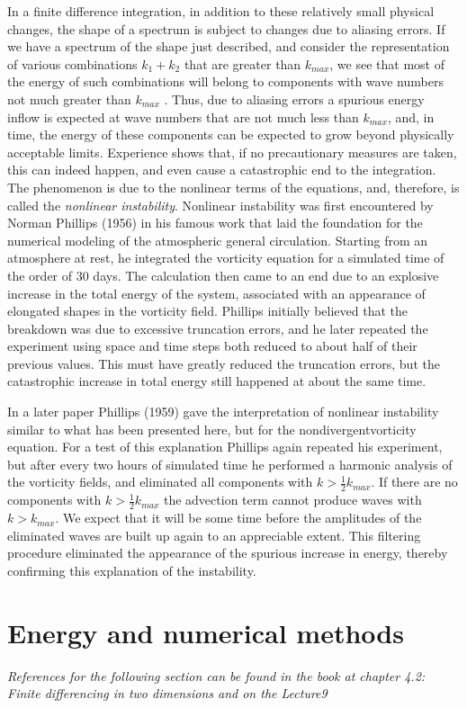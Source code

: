 In a finite difference integration, in addition to these relatively small physical changes, the shape of a spectrum is subject to changes due to aliasing errors. If we have a spectrum of the shape just described, and consider the representation of various combinations $k_1+k_2$ that are greater than $k_{max}$, we see that most of the energy of such combinations will belong to components with wave numbers not much greater than $k_{max}$ . Thus, due to aliasing errors a spurious energy inflow is expected at wave numbers that are not much less than $k_{max}$, and, in time, the energy of these components can be expected to grow beyond physically acceptable limits. Experience shows that, if no precautionary measures are taken, this can indeed happen, and even cause a catastrophic end to the integration. The phenomenon is due to the nonlinear terms of the equations, and, therefore, is called the \textit{nonlinear instability}. Nonlinear instability was first encountered by Norman Phillips (1956) in his famous work that laid the foundation for the numerical modeling of the atmospheric general circulation. Starting from an atmosphere at rest, he integrated the vorticity equation for a simulated time of the order of 30 days. The calculation then came to an end due to an explosive increase in the total energy of the system, associated with an appearance of elongated shapes in the vorticity field. Phillips initially believed that the breakdown was due to excessive truncation errors, and he later repeated the experiment using space and time steps both reduced to about half of their previous values. This must have greatly reduced the truncation errors, but the catastrophic increase in total energy still happened at about the same time.

In a later paper Phillips (1959) gave the interpretation of nonlinear instability similar to what has been presented here, but for the nondivergentvorticity equation. For a test of this explanation Phillips again repeated his experiment, but after every two hours of simulated time he performed a harmonic analysis of the vorticity fields, and eliminated all components with $k>\frac{1}{2}k_{max}$. If there are no components with $k>\frac{1}{2}k_{max}$ the advection term cannot produce waves with $k>k_{max}$. We expect that it will be some time before the amplitudes of the eliminated waves are built up again to an appreciable extent. This filtering procedure eliminated the appearance of the spurious increase in energy, thereby confirming this explanation of the instability.
\section{Energy and numerical methods}\label{sec:en and numerical methods}
\begin{center}
	\textit{References for the following section can be found in the book at chapter 4.2: Finite differencing in two dimensions and on the Lecture9}
\end{center}

